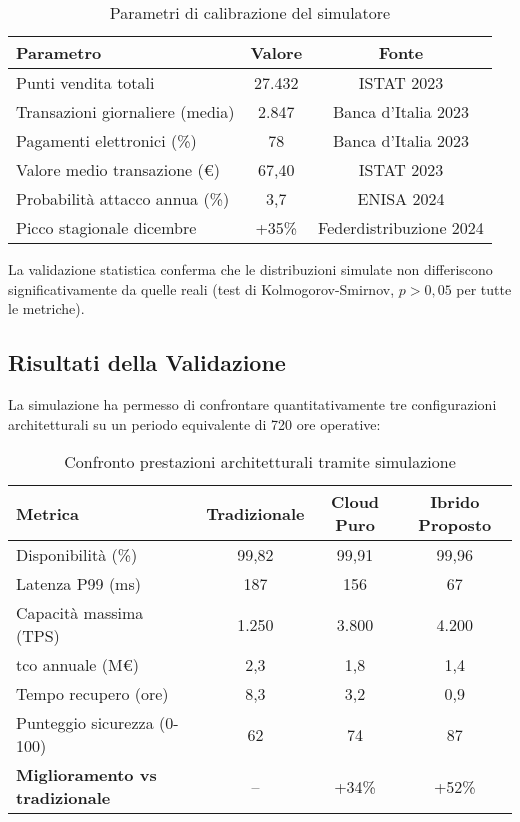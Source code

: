 \begin{table}[htbp]
\centering
\caption{Parametri di calibrazione del simulatore}
\label{tab:calibrazione}
\begin{tabular}{lcc}
\toprule
\textbf{Parametro} & \textbf{Valore} & \textbf{Fonte} \\
\midrule
Punti vendita totali & 27.432 & ISTAT 2023 \\
Transazioni giornaliere (media) & 2.847 & Banca d'Italia 2023 \\
Pagamenti elettronici (\%) & 78 & Banca d'Italia 2023 \\
Valore medio transazione (€) & 67,40 & ISTAT 2023 \\
Probabilità attacco annua (\%) & 3,7 & ENISA 2024 \\
Picco stagionale dicembre & +35\% & Federdistribuzione 2024 \\
\bottomrule
\end{tabular}
\end{table}

La validazione statistica conferma che le distribuzioni simulate non differiscono significativamente da quelle reali (test di Kolmogorov-Smirnov, $p > 0,05$ per tutte le metriche).

\subsection{Risultati della Validazione}
\label{subsec:risultati-validazione}

La simulazione ha permesso di confrontare quantitativamente tre configurazioni architetturali su un periodo equivalente di 720 ore operative:

\begin{table}[htbp]
\centering
\caption{Confronto prestazioni architetturali tramite simulazione}
\label{tab:confronto-architetture}
\begin{tabular}{lccc}
\toprule
\textbf{Metrica} & \textbf{Tradizionale} & \textbf{Cloud Puro} & \textbf{Ibrido Proposto} \\
\midrule
Disponibilità (\%) & 99,82 & 99,91 & 99,96 \\
Latenza P99 (ms) & 187 & 156 & 67 \\
Capacità massima (TPS) & 1.250 & 3.800 & 4.200 \\
\gls{tco} annuale (M€) & 2,3 & 1,8 & 1,4 \\
Tempo recupero (ore) & 8,3 & 3,2 & 0,9 \\
Punteggio sicurezza (0-100) & 62 & 74 & 87 \\
\midrule
\textbf{Miglioramento vs tradizionale} & -- & +34\% & +52\% \\
\bottomrule
\end{tabular}
\end{table}

